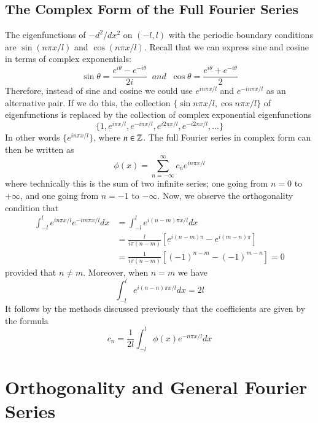 \documentclass[12pt, a4paper, oneside, openright, titlepage]{book}
\begin{document}
\subsection{The Complex Form of the Full Fourier Series}

The eigenfunctions of $-d^2/dx^2$ on $(-l,l)$ with the periodic boundary conditions are $\sin(n\pi x/l)$ and $\cos(n\pi x/l)$. Recall that we can express sine and cosine in terms of complex exponentials: \begin{equation*}
    \sin\theta = \frac{e^{i\theta}-e^{-i\theta}}{2i}\;\;and\;\;\cos\theta = \frac{e^{i\theta}+e^{-i\theta}}{2}
\end{equation*}
Therefore, instead of sine and cosine we could use $e^{in\pi x/l}$ and $e^{-in\pi x/l}$ as an alternative pair. If we do this, the collection $\{\sin n\pi x/l,\cos n\pi x/l\}$ of eigenfunctions is replaced by the collection of complex exponential eigenfunctions \begin{equation*}
    \{1,e^{i\pi x/l},e^{-i\pi x/l},e^{i2\pi x/l},e^{-i2\pi x/l},...\}
\end{equation*}
In other words $\{e^{in\pi x/l}\}$, where $n \in \mathbb Z$. The full Fourier series in complex form can then be written as \begin{equation}
    \boxed{\phi(x) = \sum_{n=-\infty}^{\infty}c_ne^{in\pi x/l}}
\end{equation}
where technically this is the sum of two infinite series; one going from $n = 0$ to $+\infty$, and one going from $n = -1$ to $-\infty$. Now, we observe the orthogonality condition that \begin{align*}
    \int_{-l}^le^{in\pi x/l}e^{-im\pi x/l}dx &= \int_{-l}^le^{i(n-m)\pi x/l}dx \\
    &= \frac{l}{i\pi (n-m)}\left[e^{i(n-m)\pi} - e^{i(m-n)\pi}\right] \\
    &= \frac{1}{i\pi(n-m)}\left[(-1)^{n-m}-(-1)^{m-n}\right] = 0
\end{align*}
provided that $n \neq m$. Moreover, when $n = m$ we have \begin{equation*}
    \int_{-l}^le^{i(n-n)\pi x/l}dx = 2l
\end{equation*}
It follows by the methods discussed previously that the coefficients are given by the formula \begin{equation}
    \boxed{c_n = \frac{1}{2l}\int_{-l}^l\phi(x)e^{-n\pi x/l}dx}
\end{equation}


\section{Orthogonality and General Fourier Series}
\end{document}
